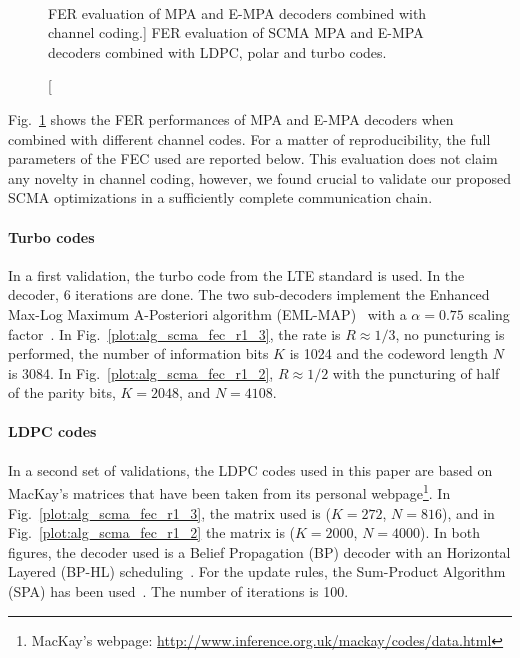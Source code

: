 \begin{figure}[htp]
  \centering
  \\
  \caption
    [FER evaluation of MPA and E-MPA decoders combined with channel coding.]
    {FER evaluation of SCMA MPA and E-MPA decoders combined with LDPC, polar
    and turbo codes.}
  \label{plot:alg_scma_fec}
\end{figure}

Fig.~\ref{plot:alg_scma_fec} shows the FER performances of MPA and E-MPA
decoders when combined with different channel codes. For a matter of
reproducibility, the full parameters of the FEC used are reported below. This
evaluation does not claim  any novelty in channel coding, however, we found
crucial to validate our proposed SCMA optimizations in a sufficiently complete
communication chain.

\paragraph{Turbo codes}

In a first validation, the turbo code from the LTE standard is used. In the
decoder, 6 iterations are done. The two sub-decoders implement the Enhanced
Max-Log Maximum A-Posteriori algorithm (EML-MAP)~\cite{Robertson1995} with a
$\alpha = 0.75$ scaling factor~\cite{Vogt2000}. In
Fig.~\ref{plot:alg_scma_fec_r1_3}, the rate is $R \approx 1/3$, no puncturing is
performed, the number of information bits $K$ is 1024 and the codeword length
$N$ is 3084. In Fig.~\ref{plot:alg_scma_fec_r1_2}, $R \approx 1/2$ with the
puncturing of half of the parity bits, $K=2048$, and $N=4108$.

\paragraph{LDPC codes}

In a second set of validations, the LDPC codes used in this paper are based on
MacKay's matrices that have been taken from its personal
webpage\footnote{MacKay's webpage: \url{http://www.inference.org.uk/mackay/codes/data.html}}.
In Fig.~\ref{plot:alg_scma_fec_r1_3}, the matrix used is ($K=272$, $N=816$), and
in Fig.~\ref{plot:alg_scma_fec_r1_2} the matrix is ($K=2000$, $N=4000$). In both
figures, the decoder used is a Belief Propagation (BP) decoder with an
Horizontal Layered (BP-HL) scheduling~\cite{Yeo2001}. For the update rules, the
Sum-Product Algorithm (SPA) has been used~\cite{MacKay1999}. The number of
iterations is 100.

